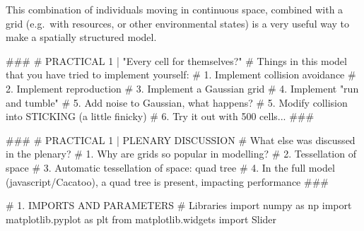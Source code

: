 \documentclass[
  letterpaper,
  DIV=11,
  numbers=noendperiod]{scrreprt}
\newenvironment{Shaded}{\begin{snugshade}}{\end{snugshade}}
\newcommand{\CommentTok}[1]{\textcolor[rgb]{0.37,0.37,0.37}{#1}}
\newcommand{\ImportTok}[1]{\textcolor[rgb]{0.00,0.46,0.62}{#1}}
\newcommand{\NormalTok}[1]{\textcolor[rgb]{0.00,0.23,0.31}{#1}}
\theoremstyle{definition}
\theoremstyle{remark}
\begin{document}
This combination of individuals moving in continuous space, combined
with a grid (e.g.~with resources, or other environmental states) is a
very useful way to make a spatially structured model.

\begin{tcolorbox}[enhanced jigsaw, left=2mm, opacitybacktitle=0.6, toptitle=1mm, colbacktitle=quarto-callout-note-color!10!white, toprule=.15mm, coltitle=black, colframe=quarto-callout-note-color-frame, opacityback=0, title=\textcolor{quarto-callout-note-color}{\faInfo}\hspace{0.5em}{Final code}, breakable, bottomtitle=1mm, rightrule=.15mm, titlerule=0mm, arc=.35mm, leftrule=.75mm, bottomrule=.15mm, colback=white]

\begin{Shaded}
\begin{Highlighting}[]

\CommentTok{\#\#\#}
\CommentTok{\# PRACTICAL 1 | "Every cell for themselves?"}
\CommentTok{\# Things in this model that you have tried to implement yourself:}
\CommentTok{\# 1. Implement collision avoidance}
\CommentTok{\# 2. Implement reproduction}
\CommentTok{\# 3. Implement a Gaussian grid}
\CommentTok{\# 4. Implement "run and tumble"}
\CommentTok{\# 5. Add noise to Gaussian, what happens?}
\CommentTok{\# 5. Modify collision into STICKING (a little finicky)}
\CommentTok{\# 6. Try it out with 500 cells... }
\CommentTok{\#\#\#}

\CommentTok{\#\#\#}
\CommentTok{\# PRACTICAL 1 | PLENARY DISCUSSION}
\CommentTok{\# What else was discussed in the plenary?}
\CommentTok{\# 1. Why are grids so popular in modelling?}
\CommentTok{\# 2. Tessellation of space}
\CommentTok{\# 3. Automatic tessellation of space: quad tree}
\CommentTok{\# 4. In the full model (javascript/Cacatoo), a quad tree is present, impacting performance}
\CommentTok{\#\#\#}

\CommentTok{\# 1. IMPORTS AND PARAMETERS}
\CommentTok{\# Libraries}
\ImportTok{import}\NormalTok{ numpy }\ImportTok{as}\NormalTok{ np}
\ImportTok{import}\NormalTok{ matplotlib.pyplot }\ImportTok{as}\NormalTok{ plt}
\ImportTok{from}\NormalTok{ matplotlib.widgets }\ImportTok{import}\NormalTok{ Slider}


\end{Highlighting}
\end{Shaded}
\end{tcolorbox}
\end{document}
